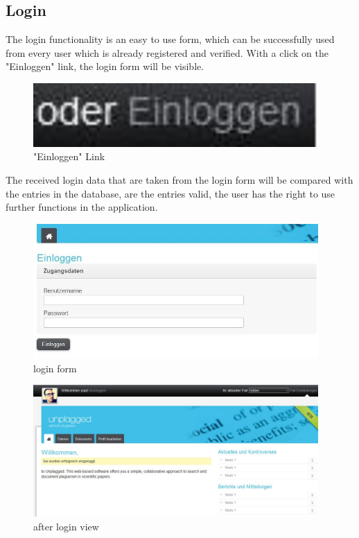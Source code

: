 \subsection{Login}

The login functionality is an easy to use form, which can be successfully used from every user which is already 
registered and verified. With a click on the "Einloggen" link, the login form will be visible.

\begin{figure}[!ht]
  \centering
    \includegraphics[width=0.97\textwidth]{images/basic_functionalities/oderEinloggen.jpg}
  \caption{"Einloggen" Link}
  \label{fig:einloggen}
\end{figure}

The received login data that are taken from the login form will be compared with the entries in the database, are the 
entries valid, the user has the right to use further functions in the application.

\begin{figure}[!ht]
  \centering
    \includegraphics[width=0.97\textwidth]{images/basic_functionalities/login_form.jpg}
  \caption{login form}
  \label{fig:einloggen}
\end{figure}

\begin{figure}[!ht]
  \centering
    \includegraphics[width=0.97\textwidth]{images/basic_functionalities/after_login.jpg}
  \caption{after login view}
  \label{fig:einloggen}
\end{figure}

